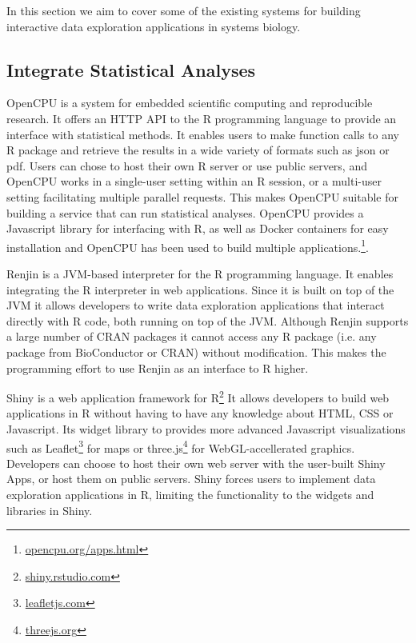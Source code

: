 In this section we aim to cover some of the existing systems for building
interactive data exploration applications in systems biology. 

\subsection*{Integrate Statistical Analyses} 
OpenCPU is a system for embedded scientific computing and reproducible
research.\cite{opencpu} It offers an HTTP API to the R programming language to
provide an interface with statistical methods. It enables users to make function
calls to any R package and retrieve the results in a wide variety of formats
such as json or pdf. 
Users can chose to host their own R server or use public servers, and OpenCPU
works in a single-user setting within an R session, or a multi-user setting
facilitating multiple parallel requests. This makes OpenCPU suitable
for building a service that can run statistical analyses. 
OpenCPU provides a Javascript library for interfacing with R, as well as Docker
containers for easy installation and OpenCPU has been used to build multiple
applications.\footnote{\url{opencpu.org/apps.html}}.

Renjin is a JVM-based interpreter for the R programming language.\cite{renjin}
It enables integrating the R interpreter in web
applications. Since it is built on top of the JVM it allows developers to 
write
data exploration applications that interact directly with R code, both running on
top of the JVM. Although Renjin supports a large number of CRAN packages it
cannot access any R package (i.e.  any package from BioConductor or CRAN)
without modification. This makes the programming effort to use Renjin as an
interface to R higher. 

Shiny is a web application framework for R\footnote{\url{shiny.rstudio.com}}
It allows developers to
build web applications in R without having to have any knowledge about HTML, CSS
or Javascript. 
Its widget library to provides more advanced Javascript
visualizations such as Leaflet\footnote{\url{leafletjs.com}} for maps or
three.js\footnote{\url{threejs.org}} for WebGL-accellerated
graphics. Developers can choose to host their own web server with the user-built
Shiny Apps, or host them on public servers. Shiny forces users to implement data
exploration applications in R, limiting the functionality to the 
widgets and libraries in Shiny. 

